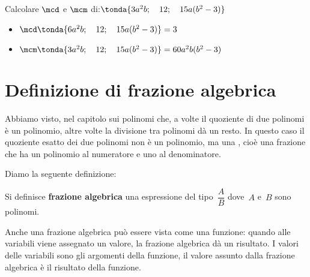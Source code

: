 \begin{esempio}{}{}
Calcolare \(\mcd\) e \(\mcm\) di:\quad \(\tonda{3a^2b;\quad 12;\quad 
15a(b^2-3)}\)
\begin{itemize}[nosep]
\item \(\mcd \tonda{6a^2b;\quad 12;\quad 15a(b^2-3)}=3\)
\item \(\mcm \tonda{3a^2b;\quad 12;\quad 15a(b^2-3)}=60a^2b(b^2-3)\)
\end{itemize}

\end{esempio}


\section{Definizione di frazione algebrica}
\label{sec:frazalg_definizione}

Abbiamo visto, nel capitolo sui polinomi che, a volte il quoziente di 
due polinomi è un polinomio, altre volte la divisione tra polinomi dà un resto.
In questo caso il quoziente esatto dei due polinomi non è un polinomio, ma 
una , cioè una frazione che ha un polinomio al 
numeratore e uno al denominatore.

% 

Diamo la seguente definizione:
\begin{definizione}{}{}
Si definisce \textbf{frazione algebrica} una espressione del
tipo~\(\dfrac{A}{B}\) dove~\(A\) e~\(B\) sono polinomi.
\end{definizione}

Anche una frazione algebrica può essere vista come una funzione: quando 
alle variabili viene assegnato un valore, la frazione algebrica dà un 
risultato.
I valori delle variabili sono gli argomenti della funzione, il valore 
assunto dalla frazione algebrica è il risultato della funzione.


